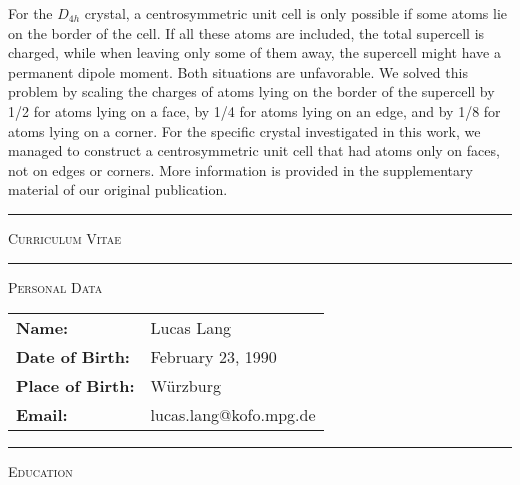For the $D_{4h}$ crystal, a centrosymmetric unit cell is only possible if some atoms lie on the border of the cell. If all these atoms are included, the total supercell is charged, while when leaving only some of them away, the supercell might have a permanent dipole moment. Both situations are unfavorable. We solved this problem by scaling the charges of atoms lying on the border of the supercell by 1/2 for atoms lying on a face, by 1/4 for atoms lying on an edge, and by 1/8 for atoms lying on a corner. For the specific crystal investigated in this work, we managed to construct a centrosymmetric unit cell that had atoms only on faces, not on edges or corners. More information is provided in the supplementary material of our original publication.












\cleardoublepage
{}  %
 


\cleardoublepage
{}
\thispagestyle{empty}

\hrule
\vspace*{0.5cm}
{\LARGE\textsc{Curriculum Vitae}}
\vspace{1cm}
\hrule
\vspace{0.5cm}
{\large\textsc{Personal Data}}
\vspace{0.5cm}

\begin{tabular}{>{\raggedleft}m{}>{\raggedright\arraybackslash}m{}}
\textbf{Name:} & Lucas Lang \\
\textbf{Date of Birth:} & February 23, 1990 \\
\textbf{Place of Birth:} & Würzburg \\
\textbf{Email:} & lucas.lang@kofo.mpg.de
\end{tabular}

\vspace{0.5cm}
\hrule
\vspace{0.5cm}
{\large\textsc{Education}}
\vspace{0.5cm}

